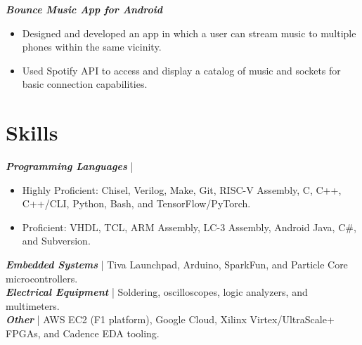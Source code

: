 \documentclass[letter]{res}
\begin{document}
\begin{resume}
\vspace{-2mm}

{\sl \textbf{Bounce Music App for Android}}\\

 \vspace{-4mm}

\begin{itemize}
 \item Designed and developed an app in which a user can stream music to multiple phones within the same vicinity.
 \item Used Spotify API to access and display a catalog of music and sockets for basic connection capabilities.
\end{itemize}

\vspace{-2mm}

\section{Skills}
{\sl \textbf{Programming Languages}} |
\begin{itemize}
 \item Highly Proficient: Chisel, Verilog, Make, Git, RISC-V Assembly, C, C++, C++/CLI, Python, Bash, and TensorFlow/PyTorch.
 \item Proficient: VHDL, TCL, ARM Assembly, LC-3 Assembly, Android Java, C\#, and Subversion.
\end{itemize}
 \vspace{-4mm}
{\sl \textbf{Embedded Systems}} | Tiva Launchpad, Arduino, SparkFun, and Particle Core microcontrollers.\\
{\sl \textbf{Electrical Equipment}} | Soldering, oscilloscopes, logic analyzers, and multimeters.\\
{\sl \textbf{Other}} | AWS EC2 (F1 platform), Google Cloud, Xilinx Virtex/UltraScale+ FPGAs, and Cadence EDA tooling.\\

\vspace{-6mm}


\end{resume}
\end{document}
